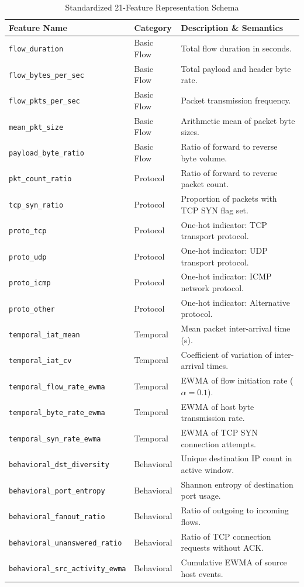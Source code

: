 \documentclass[10pt,journal,compsoc,twocolumn]{IEEEtran}
\begin{document}
\begin{table}[htbp]
\caption{Standardized 21-Feature Representation Schema}
\label{tab:feature_schema}
\centering
\begin{tabular}{llp{4.2cm}}
\toprule
\textbf{Feature Name} & \textbf{Category} & \textbf{Description \& Semantics} \\
\midrule
\texttt{flow\_duration} & Basic Flow & Total flow duration in seconds. \\
\texttt{flow\_bytes\_per\_sec} & Basic Flow & Total payload and header byte rate. \\
\texttt{flow\_pkts\_per\_sec} & Basic Flow & Packet transmission frequency. \\
\texttt{mean\_pkt\_size} & Basic Flow & Arithmetic mean of packet byte sizes. \\
\texttt{payload\_byte\_ratio} & Basic Flow & Ratio of forward to reverse byte volume. \\
\midrule
\texttt{pkt\_count\_ratio} & Protocol & Ratio of forward to reverse packet count. \\
\texttt{tcp\_syn\_ratio} & Protocol & Proportion of packets with TCP SYN flag set. \\
\texttt{proto\_tcp} & Protocol & One-hot indicator: TCP transport protocol. \\
\texttt{proto\_udp} & Protocol & One-hot indicator: UDP transport protocol. \\
\texttt{proto\_icmp} & Protocol & One-hot indicator: ICMP network protocol. \\
\texttt{proto\_other} & Protocol & One-hot indicator: Alternative protocol. \\
\midrule
\texttt{temporal\_iat\_mean} & Temporal & Mean packet inter-arrival time (s). \\
\texttt{temporal\_iat\_cv} & Temporal & Coefficient of variation of inter-arrival times. \\
\texttt{temporal\_flow\_rate\_ewma} & Temporal & EWMA of flow initiation rate ($\alpha=0.1$). \\
\texttt{temporal\_byte\_rate\_ewma} & Temporal & EWMA of host byte transmission rate. \\
\texttt{temporal\_syn\_rate\_ewma} & Temporal & EWMA of TCP SYN connection attempts. \\
\midrule
\texttt{behavioral\_dst\_diversity} & Behavioral & Unique destination IP count in active window. \\
\texttt{behavioral\_port\_entropy} & Behavioral & Shannon entropy of destination port usage. \\
\texttt{behavioral\_fanout\_ratio} & Behavioral & Ratio of outgoing to incoming flows. \\
\texttt{behavioral\_unanswered\_ratio} & Behavioral & Ratio of TCP connection requests without ACK. \\
\texttt{behavioral\_src\_activity\_ewma} & Behavioral & Cumulative EWMA of source host events. \\
\bottomrule
\end{tabular}
\end{table}
\end{document}
